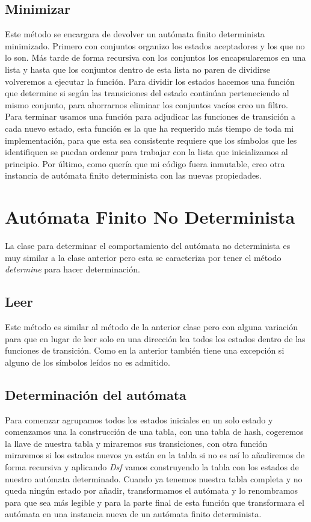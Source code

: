 \documentclass{article}
\begin{document}
    \subsection{Minimizar}\label{subsec:minimizar}
    Este método se encargara de devolver un autómata finito determinista minimizado.
    Primero con conjuntos organizo los estados aceptadores y los que no lo son.
    Más tarde de forma recursiva con los conjuntos los encapsularemos en una lista y hasta que los conjuntos dentro de
    esta lista no paren de dividirse volveremos a ejecutar la función.
    Para dividir los estados hacemos una función que determine si según las transiciones del estado continúan
    perteneciendo al mismo conjunto, para ahorrarnos eliminar los conjuntos vacíos creo un filtro.
    Para terminar usamos una función para adjudicar las funciones de transición a cada nuevo estado, esta función es la
    que ha requerido más tiempo de toda mi implementación, para que esta sea consistente requiere que los símbolos que
    les identifiquen se puedan ordenar para trabajar con la lista que inicializamos al principio.
    Por último, como quería que mi código fuera inmutable, creo otra instancia de autómata  finito determinista con las
    nuevas propiedades.

    \section{Autómata Finito No Determinista}\label{sec:autómata-finito-no-determinista}
    La clase para determinar el comportamiento del autómata no determinista es muy similar a la clase anterior pero esta
    se caracteriza por tener el método  \textit{determine} para hacer determinación.

    \subsection{Leer}\label{subsec:leer}
    Este método es similar al método de la anterior clase pero con alguna variación para que en lugar de leer solo en
    una dirección lea todos los estados dentro de las funciones de transición.
    Como en la anterior también tiene una excepción si alguno de los símbolos leídos no es admitido.

    \subsection{Determinación del autómata}\label{subsec:determinación-del-autómata}
    Para comenzar agrupamos todos los estados iniciales en un solo estado y comenzamos una la construcción de una tabla,
    con una tabla de hash, cogeremos la llave de nuestra tabla y miraremos sus transiciones, con otra función miraremos
    si los estados nuevos ya están en la tabla si no es así lo añadiremos de forma recursiva y aplicando \textit{Dsf}
    vamos construyendo la tabla con los estados de nuestro autómata determinado.
    Cuando ya tenemos nuestra tabla completa y no queda ningún estado por añadir, transformamos el autómata y lo
    renombramos para que sea más legible y para la parte final de esta función que transformara el autómata en una
    instancia nueva de un autómata finito determinista.
\end{document}
